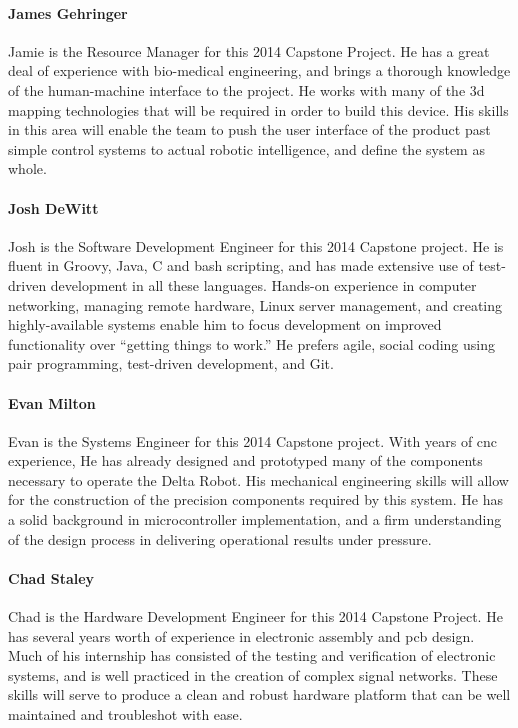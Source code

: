 \documentclass[11pt]{report}
\begin{document}
\paragraph{James Gehringer}
Jamie is the Resource Manager for this 2014 Capstone Project. He has a great deal of experience with bio-medical engineering, and brings a thorough knowledge of the human-machine interface to the project.
He works with many of the \gls{3d} mapping technologies that will be required in order to build this device.
His skills in this area will enable the team to push the user interface of the product past simple control systems to actual robotic intelligence, and define the system as whole.

\paragraph{Josh DeWitt}
Josh is the Software Development Engineer for this 2014 Capstone project.
He is fluent in Groovy, Java, C and bash scripting, and has made extensive use of test-driven development in all these languages.
Hands-on experience in computer networking, managing remote hardware, Linux server management, and creating highly-available systems enable him to focus development on improved functionality over “getting things to work.”
He prefers agile, social coding using pair programming, test-driven development, and Git. 

\paragraph{Evan Milton}
Evan is the Systems Engineer for this 2014 Capstone project.
With years of \gls{cnc} experience, He has already designed and prototyped many of the components necessary to operate the Delta Robot.
His mechanical engineering skills will allow for the construction of the precision components required by this system.
He has a solid background in microcontroller implementation, and a firm understanding of the design process in delivering operational results under pressure.

\paragraph{Chad Staley}
Chad is the Hardware Development Engineer for this 2014 Capstone Project.
He has several years worth of experience in electronic assembly and \gls{pcb} design.
Much of his internship has consisted of the testing and verification of electronic systems, and is well practiced in the creation of complex signal networks.
These skills will serve to produce a clean and robust hardware platform that can be well maintained and troubleshot with ease.
\end{document}
